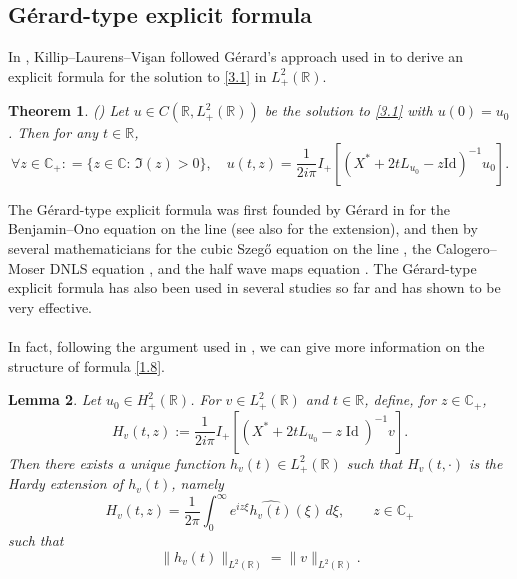\documentclass[10pt]{article}
\newtheorem{theorem}{Theorem}
\newtheorem{lemma}[theorem]{Lemma}
\numberwithin{equation}{section}
\numberwithin{theorem}{section}
\begin{document}
\subsection{Gérard-type explicit formula}
In \cite{2}, Killip--Laurens--Vişan followed Gérard's approach used in \cite{1} to derive an explicit formula for the solution to \eqref{3.1} in $L_{+}^2(\mathbb{R})$.
\begin{theorem}(\cite[Theorem 1.7]{2})
\label{theorem 1.3}
Let $u \in C\left(\mathbb{R}, L_{+}^2(\mathbb{R})\right)$ be the solution to \eqref{3.1} with $u(0)=u_0$. Then for any $t \in \mathbb{R}$,
\begin{equation}
\label{1.8}
\forall z \in \mathbb{C}_{+}: = \{z \in \mathbb{C}: \,\Im(z)>0\}, \quad  u(t, z)=\frac{1}{2 i \pi} I_{+}\left[\left(X^{*}+2 t L_{u_0}-z \mathrm{Id}\right)^{-1} u_0\right] .
\end{equation}
\end{theorem}
\noindent The Gérard-type explicit formula was first founded by Gérard in \cite{1} for the Benjamin--Ono equation on the line (see also \cite{27} for the extension), and then by several mathematicians for the cubic Szeg\H{o} equation on the line \cite{80}, the Calogero--Moser DNLS equation \cite{2,70}, and the half wave maps equation \cite{30,30.1}.  The Gérard-type explicit formula has also been used in several studies \cite{80,20,2,27,13,29,25,30,90,0,89,30.1,0.01,20.1,66,0.1,67,4.44,14.1} so far and has shown to be very effective. \\\\
In fact, following the argument used in \cite[Lemma 3.1]{27}, we can give more information on the structure of formula \eqref{1.8}.
\begin{lemma}
\label{lemma:lax-resolvent-hardy-bound}
Let $u_0\in H_{+}^2(\mathbb{R})$. For
$v\in L^2_+(\mathbb R)$ and 
$t\in\mathbb R$, define, for \(z\in\mathbb C_+\),
\begin{equation}
\label{eq:lax-resolvent-hardy-function}
H_v(t,z)
:=
\frac{1}{2i\pi}
I_+\left[
\left(X^*+2tL_{u_0}-z\operatorname{Id}\right)^{-1}v
\right].
\end{equation}
Then there exists a unique function $h_v(t)\in L^2_+(\mathbb R)$
such that \(H_v(t,\cdot)\) is the Hardy extension of \(h_v(t)\), namely
\begin{equation}
\label{eq:lax-resolvent-hardy-representation}
H_v(t,z)
=
\frac1{2\pi}
\int_0^\infty e^{iz\xi}\widehat{h_v(t)}(\xi)\,d\xi,
\qquad z\in\mathbb C_+
\end{equation}
such that
\begin{equation}
\label{eq:lax-resolvent-hardy-bound}
\|h_v(t)\|_{L^2(\mathbb R)}
=
\|v\|_{L^2(\mathbb R)}.
\end{equation}
\end{lemma}
\end{document}
